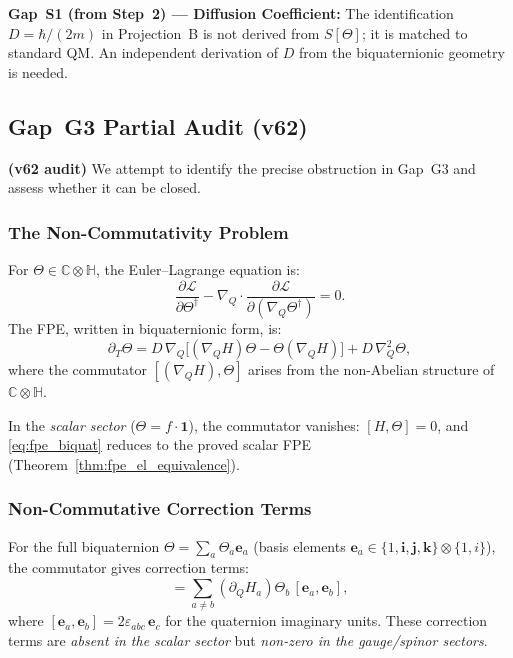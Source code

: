 \documentclass[12pt,a4paper]{article}
\theoremstyle{definition}
\theoremstyle{remark}
\begin{document}
\begin{gapbox}
\textbf{Gap~S1 (from Step~2) --- Diffusion Coefficient:}
The identification $D = \hbar/(2m)$ in Projection~B is not derived
from $S[\Theta]$; it is matched to standard QM.  An independent
derivation of $D$ from the biquaternionic geometry is needed.
\end{gapbox}

\subsection{Gap~G3 Partial Audit (v62)}
\label{subsec:gap_g3_audit}

\textbf{(v62 audit)} We attempt to identify the precise obstruction in
Gap~G3 and assess whether it can be closed.

\subsubsection{The Non-Commutativity Problem}

For $\Theta \in \mathbb{C}\otimes\mathbb{H}$, the Euler--Lagrange equation is:
\begin{equation}
  \frac{\partial\mathcal{L}}{\partial\Theta^\dagger}
  - \nabla_Q \cdot \frac{\partial\mathcal{L}}{\partial(\nabla_Q\Theta^\dagger)}
  = 0.
  \label{eq:el_biquat}
\end{equation}
The FPE, written in biquaternionic form, is:
\begin{equation}
  \partial_T\Theta = D\,\nabla_Q\bigl[(\nabla_Q H)\Theta - \Theta(\nabla_Q H)\bigr]
                  + D\,\nabla_Q^2\Theta,
  \label{eq:fpe_biquat}
\end{equation}
where the commutator $[(\nabla_Q H), \Theta]$ arises from the non-Abelian
structure of $\mathbb{C}\otimes\mathbb{H}$.

In the \emph{scalar sector} ($\Theta = f \cdot \mathbf{1}$), the commutator
vanishes: $[H, \Theta] = 0$, and \eqref{eq:fpe_biquat} reduces to the proved
scalar FPE (Theorem~\ref{thm:fpe_el_equivalence}).

\subsubsection{Non-Commutative Correction Terms}

For the full biquaternion $\Theta = \sum_a \Theta_a \mathbf{e}_a$
(basis elements $\mathbf{e}_a \in \{1, \mathbf{i}, \mathbf{j}, \mathbf{k}\}
\otimes \{1, i\}$), the commutator gives correction terms:
\begin{equation}
  [(\nabla_Q H), \Theta]
  = \sum_{a \ne b} (\partial_Q H_a) \Theta_b\,[\mathbf{e}_a, \mathbf{e}_b],
  \label{eq:commutator_correction}
\end{equation}
where $[\mathbf{e}_a, \mathbf{e}_b] = 2\varepsilon_{abc}\,\mathbf{e}_c$ for
the quaternion imaginary units.  These correction terms are \emph{absent in
the scalar sector} but \emph{non-zero in the gauge/spinor sectors}.
\end{document}
